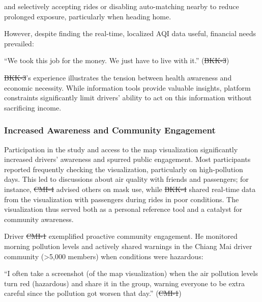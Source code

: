 \documentclass[sigconf,screen,natbib=true]{acmart}
\providecommand{\DIFadd}[1]{{\protect\color{blue}\uwave{#1}}} %
\providecommand{\DIFdel}[1]{{\protect\color{red}\sout{#1}}} %
\providecommand{\DIFaddbegin}{} %
\providecommand{\DIFaddend}{} %
\providecommand{\DIFdelbegin}{} %
\providecommand{\DIFdelend}{} %
\begin{document}
and selectively accepting rides or disabling auto-matching nearby to reduce prolonged exposure, particularly when heading home.



However, despite finding the real-time, localized AQI data useful, financial needs prevailed:

\begin{quoteb}
    ``We took this job for the money. We just have to live with it.'' (\DIFdelbegin \DIFdel{BKK-3}\DIFdelend \DIFaddbegin \DIFadd{BKK3}\DIFaddend )
\end{quoteb}

\DIFdelbegin \DIFdel{BKK-3}\DIFdelend \DIFaddbegin \DIFadd{BKK3}\DIFaddend 's experience illustrates the tension between health awareness and economic necessity.
While information tools provide valuable insights, platform constraints significantly limit drivers' ability to act on this information without sacrificing income.

\subsubsection{Increased Awareness and Community Engagement}
Participation in the study and access to the map visualization significantly increased drivers' awareness and spurred public engagement.
Most participants reported frequently checking the visualization, particularly on high-pollution days.
This led to discussions about air quality with friends and passengers; for instance, \DIFdelbegin \DIFdel{CMI-4 }\DIFdelend \DIFaddbegin \DIFadd{CMI4 }\DIFaddend advised others on mask use, while \DIFdelbegin \DIFdel{BKK-4 }\DIFdelend \DIFaddbegin \DIFadd{BKK4 }\DIFaddend shared real-time data from the visualization with passengers during rides in poor conditions.
The visualization thus served both as a personal reference tool and a catalyst for community awareness.

Driver \DIFdelbegin \DIFdel{CMI-1 }\DIFdelend \DIFaddbegin \DIFadd{CMI1 }\DIFaddend exemplified proactive community engagement.
He monitored morning pollution levels and actively shared warnings in the Chiang Mai \DIFdelbegin %
\DIFdelend \DIFaddbegin \DIFadd{rideshare }\DIFaddend driver community (>5,000 members) when conditions were hazardous:

\begin{quoteb}
 ``I often take a screenshot (of the map visualization) when the air pollution levels turn red (hazardous) and share it in the group, warning everyone to be extra careful since the pollution got worsen that day.'' (\DIFdelbegin \DIFdel{CMI-1}\DIFdelend \DIFaddbegin \DIFadd{CMI1}\DIFaddend )
\end{quoteb}
\end{document}
